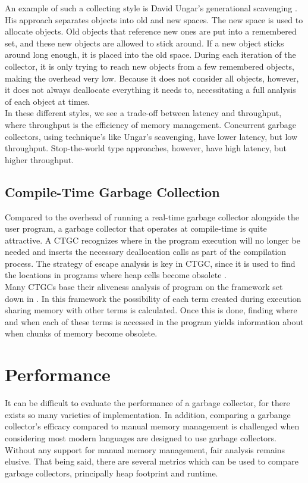 \documentclass[12pt]{article}
\begin{document}
An example of such a collecting style is David Ungar's generational scavenging \cite{ungar}. His approach separates objects into old and new spaces. The new space is used to allocate objects. Old objects that reference new ones are put into a remembered set, and these new objects are allowed to stick around. If a new object sticks around long enough, it is placed into the old space. During each iteration of the collector, it is only trying to reach new objects from a few remembered objects, making the overhead very low. Because it does not consider all objects, however, it does not always deallocate everything it needs to, necessitating a full analysis of each object at times.\\

In these different styles,  we see a trade-off between latency and throughput, where throughput is the efficiency of memory management. Concurrent garbage collectors, using technique's like Ungar's scavenging, have lower latency, but low throughput. Stop-the-world type approaches, however, have high latency, but higher throughput.

\subsection{Compile-Time Garbage Collection}
Compared to the overhead of running a real-time garbage collector alongside the user program, a garbage collector that operates at compile-time is quite attractive. A CTGC recognizes where in the program execution will no longer be needed and inserts the necessary deallocation calls as part of the compilation process. The strategy of escape analysis is key in CTGC, since it is used to find the locations in programs where heap cells become obsolete \cite{mercury}.\\

Many CTGCs base their aliveness analysis of program on the framework set down in \cite{bruynooghe}. In this framework the possibility of each term created during execution sharing memory with other terms is calculated. Once this is done, finding where and when each of these terms is accessed in the program yields information about when chunks of memory become obsolete. 


\section{Performance}

It can be difficult to evaluate the performance of a garbage collector, for there exists so many varieties of implementation. In addition, comparing a garbange collector's efficacy compared to manual memory management is challenged when considering most modern languages are designed to use garbage collectors. Without any support for manual memory management, fair analysis remains elusive. That being said, there are several metrics which can be used to compare garbage collectors, principally heap footprint and runtime.
\end{document}
